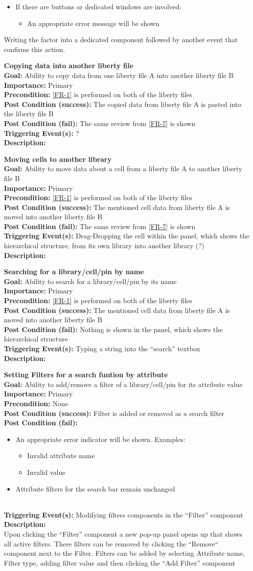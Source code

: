 \documentclass[10pt,a4paper]{report}
\newcommand{\FRDescription}[8]{
    \textbf{#1} \\
    \textbf{Goal: } #2 \\
    \textbf{Importance: } #3 \\
    \textbf{Precondition: } #4 \\
    \textbf{Post Condition (success): } #5 \\
    \textbf{Post Condition (fail): } #6 \\
    \textbf{Triggering Event(s): } #7 \\
    \textbf{Description: } \\ 
    #8}
\begin{document}
\begin{FR}
{\begin{itemize}
\begin{itemize}
            \item If there are buttons or dedicated windows are involved:
            \begin{itemize}
                \item An appropriate error message will be shown
            \end{itemize}
        \end{itemize}
    \end{itemize}}
    {Writing the factor into a dedicated component followed by another event that confirms this action.}
    \item \FRDescription{Copying data into another liberty file}
    {Ability to copy data from one liberty file A into another liberty file B}
    {Primary}
    {\ref{FR-1} is performed on both of the liberty files}
    {The copied data from liberty file A is pasted into the liberty file B}
    {The same review from \ref{FR-7} is shown}
    {?}
    \item \FRDescription{Moving cells to another library}
    {Ability to move data about a cell from a liberty file A to another liberty file B}
    {Primary}
    {\ref{FR-1} is performed on both of the liberty files}
    {The mentioned cell data from liberty file A is moved into another liberty file B}
    {The same review from \ref{FR-7} is shown}
    {Drag-Dropping the cell within the panel, which shows the hierarchical structure, from its own library into another library (?)}
    \item \FRDescription{Searching for a library/cell/pin by name}
    {Ability to search for a library/cell/pin by its name}
    {Primary}
    {\ref{FR-1} is performed on both of the liberty files}
    {The mentioned cell data from liberty file A is moved into another liberty file B}
    {Nothing is shown in the panel, which shows the hierarchical structure}
    {Typing a string into the “search” textbox}
    \item \FRDescription{Setting Filters for a search funtion by attribute}
    {Ability to add/remove a filter of a library/cell/pin for its attribute value}
    {Primary}
    {None}
    {Filter is added or removed as a search filter}
    {\begin{itemize}
        \item An appropriate error indicator will be shown. Examples:
        \begin{itemize}
            \item Invalid attribute name
            \item Invalid value
        \end{itemize}
        \item Attribute filters for the search bar remain unchanged
    \end{itemize}}
    {Modifying filters components in the “Filter” component}
    {Upon clicking the “Filter” component a new pop-up panel opens up that shows all active filters. There filters can be removed by clicking the “Remove“ component next to the Filter. Filters can be added by selecting Attribute name, Filter type, adding filter value and then clicking the “Add Filter” component}
\end{FR}
\end{document}
